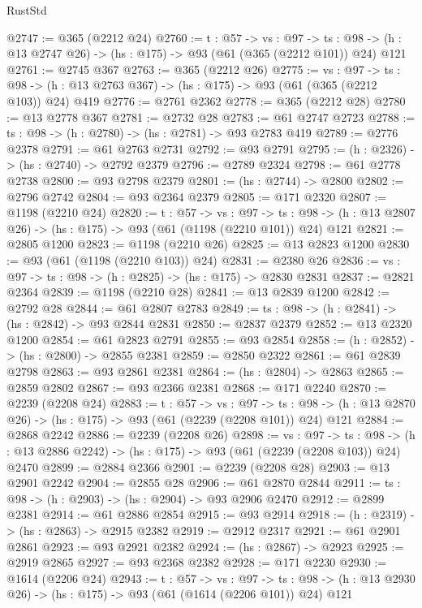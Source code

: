 \begin{lexlean}{RustStd}
\begin{coremodule}
@2747 := @365 (@2212 @24)
@2760 := {t : @57} ->
  {vs : @97} ->
  {ts : @98} -> (h : @13 @2747 @26) -> (hs : @175) -> @93 (@61 (@365 (@2212 @101)) @24) @121
@2761 := @2745 @367
@2763 := @365 (@2212 @26)
@2775 := {vs : @97} ->
  {ts : @98} -> (h : @13 @2763 @367) -> (hs : @175) -> @93 (@61 (@365 (@2212 @103)) @24) @419
@2776 := @2761 @2362
@2778 := @365 (@2212 @28)
@2780 := @13 @2778 @367
@2781 := @2732 @28
@2783 := @61 @2747 @2723
@2788 := {ts : @98} -> (h : @2780) -> (hs : @2781) -> @93 @2783 @419
@2789 := @2776 @2378
@2791 := @61 @2763 @2731
@2792 := @93 @2791
@2795 := (h : @2326) -> (hs : @2740) -> @2792 @2379
@2796 := @2789 @2324
@2798 := @61 @2778 @2738
@2800 := @93 @2798 @2379
@2801 := (hs : @2744) -> @2800
@2802 := @2796 @2742
@2804 := @93 @2364 @2379
@2805 := @171 @2320
@2807 := @1198 (@2210 @24)
@2820 := {t : @57} ->
  {vs : @97} ->
  {ts : @98} -> (h : @13 @2807 @26) -> (hs : @175) -> @93 (@61 (@1198 (@2210 @101)) @24) @121
@2821 := @2805 @1200
@2823 := @1198 (@2210 @26)
@2825 := @13 @2823 @1200
@2830 := @93 (@61 (@1198 (@2210 @103)) @24)
@2831 := @2380 @26
@2836 := {vs : @97} -> {ts : @98} -> (h : @2825) -> (hs : @175) -> @2830 @2831
@2837 := @2821 @2364
@2839 := @1198 (@2210 @28)
@2841 := @13 @2839 @1200
@2842 := @2792 @28
@2844 := @61 @2807 @2783
@2849 := {ts : @98} -> (h : @2841) -> (hs : @2842) -> @93 @2844 @2831
@2850 := @2837 @2379
@2852 := @13 @2320 @1200
@2854 := @61 @2823 @2791
@2855 := @93 @2854
@2858 := (h : @2852) -> (hs : @2800) -> @2855 @2381
@2859 := @2850 @2322
@2861 := @61 @2839 @2798
@2863 := @93 @2861 @2381
@2864 := (hs : @2804) -> @2863
@2865 := @2859 @2802
@2867 := @93 @2366 @2381
@2868 := @171 @2240
@2870 := @2239 (@2208 @24)
@2883 := {t : @57} ->
  {vs : @97} ->
  {ts : @98} -> (h : @13 @2870 @26) -> (hs : @175) -> @93 (@61 (@2239 (@2208 @101)) @24) @121
@2884 := @2868 @2242
@2886 := @2239 (@2208 @26)
@2898 := {vs : @97} ->
  {ts : @98} -> (h : @13 @2886 @2242) -> (hs : @175) -> @93 (@61 (@2239 (@2208 @103)) @24) @2470
@2899 := @2884 @2366
@2901 := @2239 (@2208 @28)
@2903 := @13 @2901 @2242
@2904 := @2855 @28
@2906 := @61 @2870 @2844
@2911 := {ts : @98} -> (h : @2903) -> (hs : @2904) -> @93 @2906 @2470
@2912 := @2899 @2381
@2914 := @61 @2886 @2854
@2915 := @93 @2914
@2918 := (h : @2319) -> (hs : @2863) -> @2915 @2382
@2919 := @2912 @2317
@2921 := @61 @2901 @2861
@2923 := @93 @2921 @2382
@2924 := (hs : @2867) -> @2923
@2925 := @2919 @2865
@2927 := @93 @2368 @2382
@2928 := @171 @2230
@2930 := @1614 (@2206 @24)
@2943 := {t : @57} ->
  {vs : @97} ->
  {ts : @98} -> (h : @13 @2930 @26) -> (hs : @175) -> @93 (@61 (@1614 (@2206 @101)) @24) @121

\end{coremodule}
\end{lexlean}
